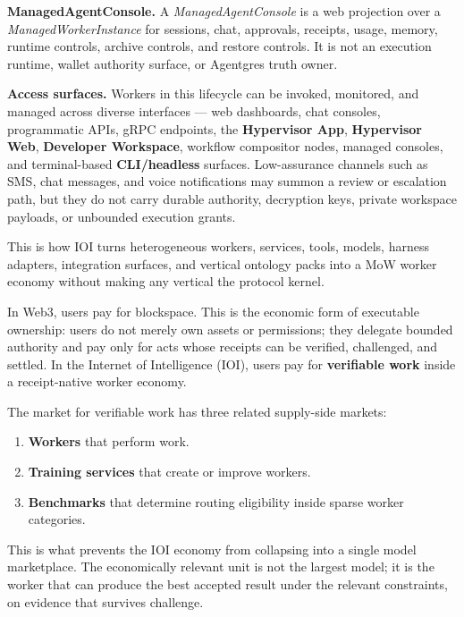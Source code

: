 \documentclass[
  11pt,
]{article}
\providecommand{\tightlist}{%
  \setlength{\itemsep}{0pt}\setlength{\parskip}{0pt}}
\begin{document}
\textbf{ManagedAgentConsole.} A \emph{ManagedAgentConsole} is a web
projection over a \emph{ManagedWorkerInstance} for sessions, chat,
approvals, receipts, usage, memory, runtime controls, archive controls,
and restore controls. It is not an execution runtime, wallet authority
surface, or Agentgres truth owner.

\textbf{Access surfaces.} Workers in this lifecycle can be invoked,
monitored, and managed across diverse interfaces --- web dashboards,
chat consoles, programmatic APIs, gRPC endpoints, the \textbf{Hypervisor
App}, \textbf{Hypervisor Web}, \textbf{Developer Workspace}, workflow compositor
nodes, managed consoles, and terminal-based \textbf{CLI/headless}
surfaces. Low-assurance channels such as SMS, chat messages, and voice
notifications may summon a review or escalation path, but they do not
carry durable authority, decryption keys, private workspace payloads, or
unbounded execution grants.

This is how IOI turns heterogeneous workers, services, tools, models,
harness adapters, integration surfaces, and vertical ontology packs into
a MoW worker economy without making any vertical the protocol kernel.

In Web3, users pay for blockspace. This is the economic form of
executable ownership: users do not merely own assets or permissions;
they delegate bounded authority and pay only for acts whose receipts can
be verified, challenged, and settled. In the Internet of Intelligence
(IOI), users pay for \textbf{verifiable work} inside a receipt-native
worker economy.

The market for verifiable work has three related supply-side markets:

\begin{enumerate}
\def\labelenumi{\arabic{enumi}.}
\tightlist
\item
  \textbf{Workers} that perform work.
\item
  \textbf{Training services} that create or improve workers.
\item
  \textbf{Benchmarks} that determine routing eligibility inside sparse
  worker categories.
\end{enumerate}

This is what prevents the IOI economy from collapsing into a single
model marketplace. The economically relevant unit is not the largest
model; it is the worker that can produce the best accepted result under
the relevant constraints, on evidence that survives challenge.
\end{document}
